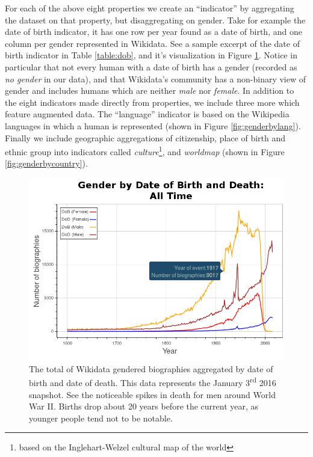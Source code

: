 \documentclass{sig-alternate-05-2015}
\begin{document}
For each of the above eight properties we create an ``indicator'' by aggregating the dataset on that property, but disaggregating on gender. Take for example the date of birth indicator, it has one row per year found as a date of birth, and one column per gender represented in Wikidata. See a sample excerpt of the date of birth indicator in Table \ref{table:dob}, and it's visualization in Figure \ref{fig:genderbydob}. Notice in particular that not every human with a date of birth has a gender (recorded as \textit{no gender} in our data), and that Wikidata's community has a non-binary view of gender and includes humans which are neither \textit{male} nor \textit{female}. In addition to the eight indicators made directly from properties, we include three more which feature augmented data. The ``language'' indicator is based on the Wikipedia languages in which a human is represented (shown in Figure \ref{fig:genderbylang}). Finally we include geographic aggregations of citizenship, place of birth and ethnic group into indicators called \textit{culture}\footnote{based on the Inglehart-Welzel cultural map of the world}, and \textit{worldmap} (shown in Figure \ref{fig:genderbycountry}).


\begin{figure}
\includegraphics[width=\columnwidth]{figures/genderbydob.png} 
\caption{The total of Wikidata gendered biographies aggregated by date of birth and date of death. This data represents the January 3\textsuperscript{rd} 2016 snapshot. See the noticeable spikes in death for men around World War II. Births drop about 20 years before the current year, as younger people tend not to be notable.}
\label{fig:genderbydob}
\end{figure}
\end{document}
